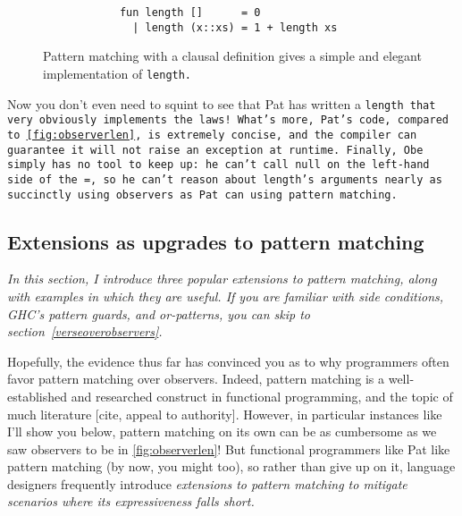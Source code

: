 \documentclass[manuscript,screen,review, 12pt]{acmart}
\begin{document}
    

    \begin{figure}[ht]
    \smllst
    \begin{verbatim}
            fun length []      = 0
              | length (x::xs) = 1 + length xs
        \end{verbatim}
    \caption{Pattern matching with a clausal definition gives a simple and 
             elegant implementation of \tt{length}.}
    \label{fig:pmclausallen}
    \end{figure}
    
    Now you don't even need to squint to see that Pat has written a \tt{length}
    that very obviously implements the laws! What's more, Pat's code, compared
    to~\ref{fig:observerlen}, is extremely concise, and the compiler can
    guarantee it will not raise an exception at runtime. Finally, Obe simply has
    no tool to keep up: he can't call \tt{null} on the left-hand side of the
    \tt{=}, so he can't reason about \tt{length}'s arguments nearly as
    succinctly using observers as Pat can using pattern matching. 


    

\subsection{Extensions as upgrades to pattern matching}
\label{extensions}
    \it{In this section, I introduce three popular extensions to pattern
    matching, along with examples in which they are useful. If you are familiar
    with side conditions, GHC's pattern guards, and or-patterns, you can skip to
    section~\ref{verseoverobservers}.}

    Hopefully, the evidence thus far has convinced you as to why programmers
    often favor pattern matching over observers. Indeed, pattern matching is a
    well-established and researched construct in functional programming, and the
    topic of much literature [cite, appeal to authority]. However, in particular
    instances like I'll show you below, pattern matching on its own can be as
    cumbersome as we saw observers to be in \ref{fig:observerlen}! But
    functional programmers like Pat like pattern matching (by now, you might
    too), so rather than give up on it, language designers frequently introduce
    \it{extensions} to pattern matching to mitigate scenarios where its
    expressiveness falls short. 
    
\end{document}
